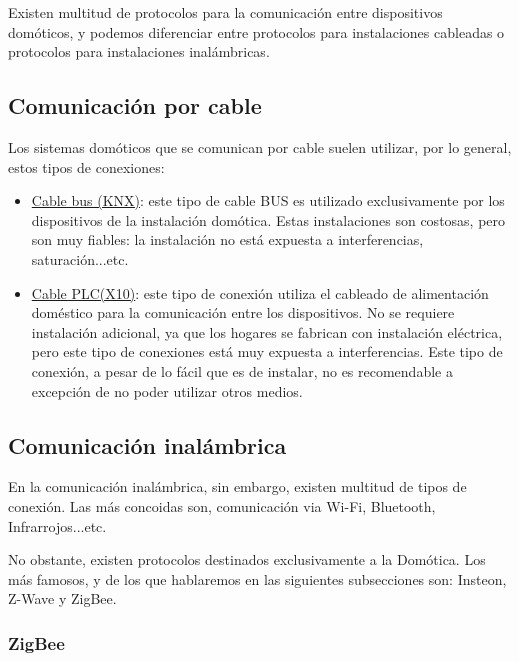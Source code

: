 
Existen multitud de protocolos para la comunicación entre dispositivos domóticos, y podemos diferenciar entre protocolos para instalaciones cableadas o
protocolos para instalaciones inalámbricas.

\subsection{Comunicación por cable}

Los sistemas domóticos que se comunican por cable suelen utilizar, por lo general, estos tipos de conexiones:

\begin{itemize}
\item\underline{Cable bus (KNX)}: este tipo de cable BUS es utilizado exclusivamente por los dispositivos de la instalación domótica. Estas instalaciones
son costosas, pero son muy fiables: la instalación no está expuesta a interferencias, saturación...etc.
\item\underline{Cable PLC(X10)}: este tipo de conexión utiliza el cableado de alimentación doméstico para la comunicación entre los dispositivos. No se requiere
instalación adicional, ya que los hogares se fabrican con instalación eléctrica, pero este tipo de conexiones está muy expuesta a interferencias. Este tipo de conexión,
a pesar de lo fácil que es de instalar, no es recomendable a excepción de no poder utilizar otros medios.
\end{itemize}

\subsection{Comunicación inalámbrica}

En la comunicación inalámbrica, sin embargo, existen multitud de tipos de conexión. Las más concoidas son, comunicación via Wi-Fi, Bluetooth, Infrarrojos...etc.
\par
No obstante, existen protocolos destinados exclusivamente a la Domótica. Los más famosos, y de los que hablaremos en las siguientes subsecciones son: Insteon, 
Z-Wave y ZigBee.

\subsubsection{ZigBee}


